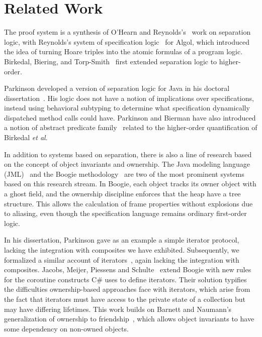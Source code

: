 % 

\section{Related Work}
The proof system is a synthesis of O'Hearn and
Reynolds's~\cite{sep-logic} work on separation logic, with Reynolds's
system of specification logic~\cite{spec-logic} for Algol, which
introduced the idea of turning Hoare triples into the atomic formulas
of a program logic. Birkedal, Biering, and Torp-Smith~\cite{hosl}
first extended separation logic to higher-order.

Parkinson developed a version of separation logic for Java in his
doctoral dissertation~\cite{parkinson-thesis}. His logic does not have
a notion of implications over specifications, instead using behavioral
subtyping to determine what specification dynamically dispatched
method calls could have. Parkinson and Bierman have also introduced a
notion of abstract predicate family~\cite{parkinson-bierman-05}
related to the higher-order quantification of Birkedal \emph{et al}.


In addition to systems based on separation, there is also a line of
research based on the concept of object invariants and ownership.  The
Java modeling language (JML)~\cite{jml} and the Boogie
methodology~\cite{boogie} are two of the most prominent systems based
on this research stream. In Boogie, each object tracks its owner
object with a ghost field, and the ownership discipline enforces that
the heap have a tree structure. This allows the calculation of frame
properties without explosions due to aliasing, even though the
specification language remains ordinary first-order logic.

In his dissertation, Parkinson gave as an example a simple iterator
protocol, lacking the integration with composites we have exhibited.
Subsequently, we formalized a similar account of
iterators~\cite{iterator}, again lacking the integration with
composites. Jacobs, Meijer, Piessens and
Schulte~\cite{iterators-revisited} extend Boogie with new rules for
the coroutine constructs C\# uses to define iterators. Their solution
typifies the difficulties ownership-based approaches face with
iterators, which arise from the fact that iterators must have access
to the private state of a collection but may have differing
lifetimes. This work builds on Barnett and Naumann's generalization of
ownership to friendship~\cite{friends}, which allows object invariants
to have some dependency on non-owned objects.

